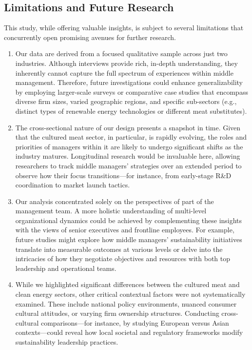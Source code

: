 	\subsection{Limitations and Future Research}
	This study, while offering valuable insights, is subject to several limitations that concurrently open promising avenues for further research.
	\begin{enumerate}
		\item Our data are derived from a focused qualitative sample across just two industries. Although interviews provide rich, in-depth understanding, they inherently cannot capture the full spectrum of experiences within middle management. Therefore, future investigations could enhance generalizability by employing larger-scale surveys or comparative case studies that encompass diverse firm sizes, varied geographic regions, and specific sub-sectors (e.g., distinct types of renewable energy technologies or different meat substitutes). \\
		
		\item The cross-sectional nature of our design presents a snapshot in time. Given that the cultured meat sector, in particular, is rapidly evolving, the roles and priorities of managers within it are likely to undergo significant shifts as the industry matures. Longitudinal research would be invaluable here, allowing researchers to track middle managers’ strategies over an extended period to observe how their focus transitions—for instance, from early-stage R\&D coordination to market launch tactics. \\
		
		\item Our analysis concentrated solely on the perspectives of part of the management team. A more holistic understanding of multi-level organizational dynamics could be achieved by complementing these insights with the views of senior executives and frontline employees. For example, future studies might explore how middle managers’ sustainability initiatives translate into measurable outcomes at various levels or delve into the intricacies of how they negotiate objectives and resources with both top leadership and operational teams. \\
		
		\item While we highlighted significant differences between the cultured meat and clean energy sectors, other critical contextual factors were not systematically examined. These include national policy environments, nuanced consumer cultural attitudes, or varying firm ownership structures. Conducting cross-cultural comparisons—for instance, by studying European versus Asian contexts—could reveal how local societal and regulatory frameworks modify sustainability leadership practices. \\
	\end{enumerate}
	
